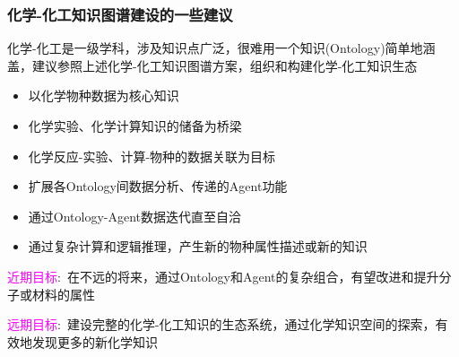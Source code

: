 %
%
%
%
%
\frame
{
	\frametitle{化学-化工知识图谱建设的一些建议}
	化学-化工是一级学科，涉及知识点广泛，很难用一个知识\textrm{(Ontology)}简单地涵盖，建议参照上述化学-化工知识图谱方案，组织和构建化学-化工知识生态
	\begin{itemize}
		\item 以化学物种数据为核心知识
		\item 化学实验、化学计算知识的储备为桥梁
		\item 化学反应-实验、计算-物种的数据关联为目标
		\item 扩展各\textrm{Ontology}间数据分析、传递的\textrm{Agent}功能
		\item 通过\textrm{Ontology}-\textrm{Agent}数据迭代直至自洽
		\item 通过复杂计算和逻辑推理，产生新的物种属性描述或新的知识
	\end{itemize}
	\textcolor{magenta}{近期目标}:~在不远的将来，通过\textrm{Ontology}和\textrm{Agent}的复杂组合，有望改进和提升分子或材料的属性

\textcolor{magenta}{远期目标}:~建设完整的化学-化工知识的生态系统，通过化学知识空间的探索，有效地发现更多的新化学知识
}
